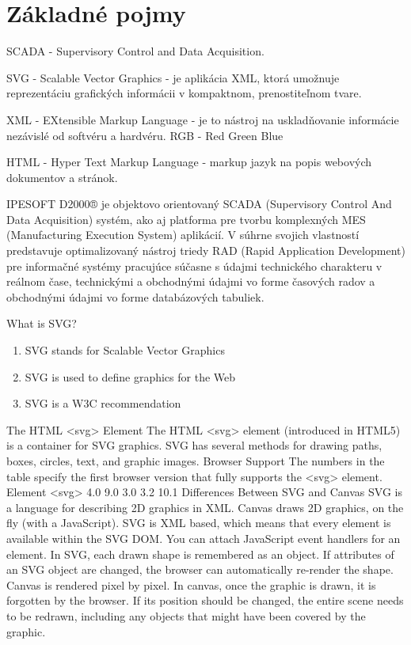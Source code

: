\chapter{Základné pojmy}

SCADA - Supervisory Control and Data Acquisition.  

SVG - Scalable Vector Graphics -  je aplikácia XML, ktorá umožnuje reprezentáciu grafických informácii v kompaktnom, prenostiteľnom tvare. 

XML - EXtensible Markup Language - je to nástroj na uskladňovanie informácie nezávislé od softvéru a hardvéru.
RGB - Red Green Blue

HTML -  Hyper Text Markup Language - markup jazyk na popis webových dokumentov a stránok.

IPESOFT D2000® je objektovo orientovaný SCADA (Supervisory Control And Data Acquisition) systém, ako aj platforma pre tvorbu komplexných MES (Manufacturing Execution System) aplikácií. V súhrne svojich vlastností predstavuje optimalizovaný nástroj triedy RAD (Rapid Application Development) pre informačné systémy pracujúce súčasne s údajmi technického charakteru v reálnom čase, technickými a obchodnými údajmi vo forme časových radov a obchodnými údajmi vo forme databázových tabuliek.



What is SVG?
\begin{enumerate}
\item	SVG stands for Scalable Vector Graphics
\item	SVG is used to define graphics for the Web
\item	SVG is a W3C recommendation
\end{enumerate}
The HTML <svg> Element
The HTML <svg> element (introduced in HTML5) is a container for SVG graphics.
SVG has several methods for drawing paths, boxes, circles, text, and graphic images.
Browser Support
The numbers in the table specify the first browser version that fully supports the <svg> element.
Element					
<svg>	4.0	9.0	3.0	3.2	10.1
Differences Between SVG and Canvas
SVG is a language for describing 2D graphics in XML.
Canvas draws 2D graphics, on the fly (with a JavaScript).
SVG is XML based, which means that every element is available within the SVG DOM. You can attach JavaScript event handlers for an element.
In SVG, each drawn shape is remembered as an object. If attributes of an SVG object are changed, the browser can automatically re-render the shape.
Canvas is rendered pixel by pixel. In canvas, once the graphic is drawn, it is forgotten by the browser. If its position should be changed, the entire scene needs to be redrawn, including any objects that might have been covered by the graphic.


